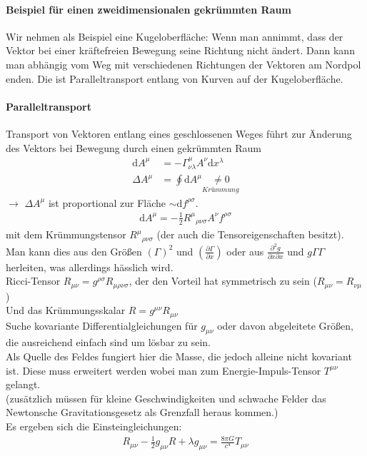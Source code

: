 \documentclass[a4paper]{article}
\begin{document}
\paragraph{Beispiel für einen zweidimensionalen gekrümmten Raum}
Wir nehmen als Beispiel eine Kugeloberfläche:
Wenn man annimmt, dass der Vektor bei einer kräftefreien Bewegung seine Richtung
nicht ändert. Dann kann man abhängig vom Weg mit verschiedenen Richtungen der
Vektoren am Nordpol enden. Die ist Paralleltransport entlang von Kurven auf der
Kugeloberfläche.
\paragraph{Paralleltransport}
Transport von Vektoren entlang eines geschlossenen Weges führt zur Änderung des
Vektors bei Bewegung durch einen gekrümmten Raum
\begin{align}
\mathrm{d}A^\mu &= - \Gamma^\mu_{\nu\lambda} A^\nu \mathrm{d}x^\lambda\\
\Delta A^\mu &= \oint \mathrm{d} A^\mu\underset{Krümmung}{\neq0}
\end{align}
$\rightarrow$ $\Delta A^\mu$ ist proportional zur Fläche $\sim
\mathrm{d}f^{\rho\sigma}$. 
\begin{align}
\mathrm{d}A^\mu=-\frac{1}{2}R^\mu{}_{\rho\nu\sigma}A^\nu f^{\rho\sigma} 
\end{align}
mit dem Krümmungstensor $R^\mu{}_{\rho\nu\sigma}$ (der auch die
Tensoreigenschaften besitzt). Man kann dies aus den Größen
$(\Gamma)^2$ und $\left( \frac{\partial \Gamma}{\partial x} \right)$ oder aus
$\frac{\partial^2 g}{\partial x\partial x}$ und $g\Gamma\Gamma$ herleiten, was
allerdings hässlich wird.\\
Ricci-Tensor $R_{\mu\nu}=g^{\rho\sigma}R_{\mu\rho\nu\sigma}$, der den Vorteil
hat symmetrisch zu sein ($R_{\mu\nu}=R_{\nu\mu}$)\\
Und das Krümmungsskalar $R=g^{\mu\nu}R_{\mu\nu}$\\
Suche kovariante Differentialgleichungen für $g_{\mu\nu}$
oder davon abgeleitete Größen, die ausreichend einfach sind um lösbar zu sein.\\
Als Quelle des Feldes fungiert hier die Masse, die jedoch alleine nicht
kovariant ist. Diese muss erweitert werden wobei man zum Energie-Impuls-Tensor
$T^{\mu\nu}$ gelangt. \\
(zusätzlich müssen für kleine Geschwindigkeiten und schwache Felder das
Newtonsche Gravitationsgesetz als Grenzfall heraus kommen.)\\
Es ergeben sich die Einsteingleichungen:
\begin{align}
R_{\mu\nu}-\frac{1}{2}g_{\mu\nu}R+\lambda g_{\mu\nu}=\frac{8\pi
G}{c^4}T_{\mu\nu}
\end{align}
\end{document}
